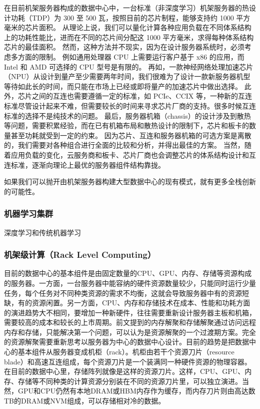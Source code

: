 在目前机架服务器构成的数据中心中，一台标准（非深度学习）机架服务器的热设计功耗（TDP）为 300 至 500 瓦，按照目前的芯片制程，能够支持约 1000 平方毫米的芯片面积。
从理论上说，我们可以量化计算各种应用负载在不同体系结构上的功耗性能比，进而在不同的芯片间分配这 1000 平方毫米，求得每种体系结构芯片的最佳面积。
然而，这种方法并不现实，因为在设计服务器系统时，必须考虑多方面的限制。
例如通用处理器 CPU 上需要运行客户基于 x86 的应用，而 Intel 和 AMD 可选择的 CPU 型号是有限的。
再如，一款神经网络处理加速芯片（NPU）从设计到量产至少需要两年时间，我们很难为了设计一款新服务器机型等待如此长的时间，而只能在市场上已经或即将量产的加速芯片中做出选择。
此外，芯片之间的互连也需要遵循一定的标准，如 PCIe、CCIX 等，一种新的互连标准尽管设计起来不难，但需要较长的时间来寻求芯片厂商的支持。很多时候互连标准的选择不是纯技术的问题。
最后，服务器机箱（chassis）的设计涉及到散热等问题，需要积累经验，而在已有机箱布局和散热设计的限制下，芯片和板卡的数量甚至功耗就受到一定的约束。
因为芯片、互连和服务器机箱的可选方案是离散的，我们需要对各种组合进行全面的比较和分析，并得出最佳的方案。
当然，随着应用负载的变化，云服务商和板卡、芯片厂商也会调整芯片的体系结构设计和互连标准，逐渐向理论上最优的服务器组件结构靠拢。

如果我们可以抛开由机架服务器构建大型数据中心的现有模式，就有更多全栈创新的可能性。

\subsubsection{机器学习集群}

深度学习和传统机器学习

\subsubsection{机架级计算（Rack Level Computing）}

目前的数据中心的基本组件是由固定数量的CPU、GPU、内存、存储等资源构成的服务器。一方面，一台服务器中能容纳的硬件资源数量较少，只能同时运行少量任务，每个任务对不同种类资源的需求不均衡，这就会导致服务器中有的资源短缺，有的资源闲置。另一方面，CPU、内存和存储技术在成本、性能和功耗方面的演进趋势大不相同，要增加一种新硬件，往往需要重新设计服务器主板和机箱，需要较高的成本和较长的上市周期。前文提到的内存解聚和存储解聚通过访问远程内存和存储，只能解决第一个问题，可以认为是资源解聚的一个过渡期方案。完全的资源解聚需要重新思考以服务器为中心的数据中心设计。目前的趋势是把数据中心的基本组件从服务器变成机柜（rack）。机柜由若干个资源刀片（resource blade）和高速互连组成，每个资源刀片是一个装满同一种硬件资源的物理容器。在目前的数据中心里，存储阵列就像是这样的资源刀片。这样，CPU、GPU、内存、存储等不同种类的计算资源分别装在不同的资源刀片里，可以独立演进。当然，GPU和CPU仍然有本地DRAM或HBM内存作为缓存，而内存刀片则由高达数TB的DRAM或NVM组成，可以存储相对冷的数据。

